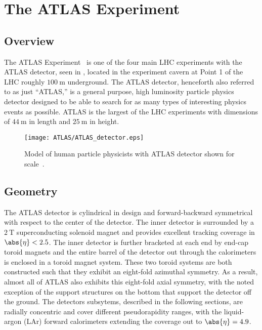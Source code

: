\chapter{The ATLAS Experiment}\label{chapter:ATLAS}

\section{Overview}\label{sec:ATLAS_overview}

The ATLAS Experiment~\cite{PERF-2007-01} is one of the four main LHC experiments with the ATLAS detector, seen in , located in the experiment cavern at Point 1 of the LHC roughly $100~\textrm{m}$ underground.
The ATLAS detector, henceforth also referred to as just ``ATLAS,'' is a general purpose, high luminosity particle physics detector designed to be able to search for as many types of interesting physics events as possible.
ATLAS is the largest of the LHC experiments with dimensions of $44~\mathrm{m}$ in length and $25~\mathrm{m}$ in height.

\begin{figure}[htbp]
 \centering
 \texttt{[image: ATLAS/ATLAS\_detector.eps]}
 \caption[Cut-away view of the ATLAS detector.]{%
  Model of human particle physicists with ATLAS detector shown for scale~\cite{Pequenao:1095924}.}\label{fig:ATLAS_detector}
\end{figure}

\clearpage
\section{Geometry}\label{sec:ATLAS_geometry}

The ATLAS detector is cylindrical in design and forward-backward symmetrical with respect to the center of the detector.
The inner detector is surrounded by a $2~\mathrm{T}$ superconducting solenoid magnet and provides excellent tracking coverage in $\abs{\eta} < 2.5$.
The inner detector is further bracketed at each end by end-cap toroid magnets and the entire barrel of the detector out through the calorimeters is enclosed in a toroid magnet system.
These two toroid systems are both constructed such that they exhibit an eight-fold azimuthal symmetry.
As a result, almost all of ATLAS also exhibits this eight-fold axial symmetry, with the noted exception of the support structures on the bottom that support the detector off the ground.
The detectors subsytems, described in the following sections, are radially concentric and cover different pseudorapidity ranges, with the liquid-argon (LAr) forward calorimeters extending the coverage out to $\abs{\eta} = 4.9$.

